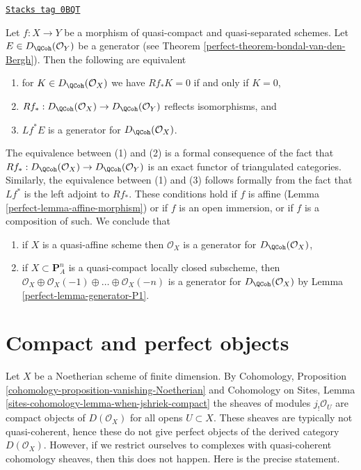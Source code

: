 \begin{remark}
\label{perfect-remark-pullback-generator}
\href{https://stacks.math.columbia.edu/tag/0BQT}{\texttt{Stacks tag 0BQT}}

Let $f : X \to Y$ be a morphism of quasi-compact and quasi-separated schemes.
Let $E \in D_\QCoh(\mathcal{O}_Y)$ be a generator
(see Theorem \ref{perfect-theorem-bondal-van-den-Bergh}).
Then the following are equivalent
\begin{enumerate}
\item for $K \in D_\QCoh(\mathcal{O}_X)$ we have
$Rf_*K = 0$ if and only if $K = 0$,
\item $Rf_* : D_\QCoh(\mathcal{O}_X) \to D_\QCoh(\mathcal{O}_Y)$
reflects isomorphisms, and
\item $Lf^*E$ is a generator for $D_\QCoh(\mathcal{O}_X)$.
\end{enumerate}
The equivalence between (1) and (2) is a formal consequence of the fact that
$Rf_* : D_\QCoh(\mathcal{O}_X) \to D_\QCoh(\mathcal{O}_Y)$ is an
exact functor of triangulated categories. Similarly, the equivalence
between (1) and (3) follows formally from the fact that $Lf^*$
is the left adjoint to $Rf_*$.
These conditions hold if $f$ is affine (Lemma \ref{perfect-lemma-affine-morphism})
or if $f$ is an open immersion, or if $f$ is a composition of such.
We conclude that
\begin{enumerate}
\item if $X$ is a quasi-affine scheme then $\mathcal{O}_X$ is a generator
for $D_\QCoh(\mathcal{O}_X)$,
\item if $X \subset \mathbf{P}^n_A$ is a quasi-compact
locally closed subscheme, then
$\mathcal{O}_X \oplus \mathcal{O}_X(-1) \oplus \ldots \oplus \mathcal{O}_X(-n)$
is a generator for $D_\QCoh(\mathcal{O}_X)$ by
Lemma \ref{perfect-lemma-generator-P1}.
\end{enumerate}
\end{remark}

\section{Compact and perfect objects}
\label{perfect-section-compact}
Let $X$ be a Noetherian scheme of finite dimension. By
Cohomology, Proposition \ref{cohomology-proposition-vanishing-Noetherian}
and
Cohomology on Sites, Lemma \ref{sites-cohomology-lemma-when-jshriek-compact}
the sheaves of modules $j_!\mathcal{O}_U$ are compact objects
of $D(\mathcal{O}_X)$ for all opens $U \subset X$.
These sheaves are typically not quasi-coherent, hence these
do not give perfect objects of the derived category $D(\mathcal{O}_X)$.
However, if we restrict ourselves to complexes with quasi-coherent
cohomology sheaves, then this does not happen.
Here is the precise statement.

